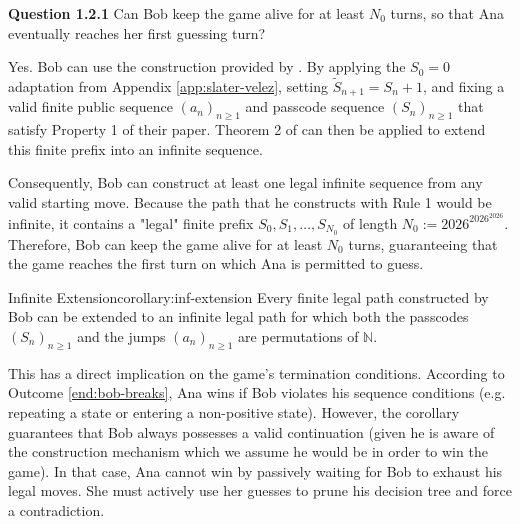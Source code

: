 \begin{questionbox}
\textbf{Question 1.2.1}
Can Bob keep the game alive for at least $N_0$ turns, so that Ana eventually reaches her first guessing turn?
\end{questionbox}

Yes. Bob can use the construction provided by \cite{slater1977permutations}. By applying the $S_0 = 0$ adaptation from Appendix \ref{app:slater-velez}, setting $\widetilde{S}_{n+1} = S_n + 1$, and fixing a valid finite public sequence $(a_n)_{n \ge 1}$ and passcode sequence $(S_n)_{n \ge 1}$ that satisfy Property 1 of their paper. Theorem 2 of \cite{slater1977permutations} can then be applied to extend this finite prefix into an infinite sequence. 

Consequently, Bob can construct at least one legal infinite sequence from any valid starting move. Because the path that he constructs with Rule 1 would be infinite, it contains a "legal" finite prefix $S_0, S_1, \ldots, S_{N_0}$ of length $N_0 := 2026^{2026^{2026}}$. Therefore, Bob can keep the game alive for at least $N_0$ turns, guaranteeing that the game reaches the first turn on which Ana is permitted to guess.



\begin{corollary}{Infinite Extension}{corollary:inf-extension}
\label{cor:inf-extension}
Every finite legal path constructed by Bob can be extended to an infinite legal path for which both the passcodes $(S_n)_{n\geq1}$ and the jumps $(a_n)_{n\geq1}$ are permutations of $\mathbb{N}$.
\end{corollary}


This has a direct implication on the game's termination conditions. According to Outcome \ref{end:bob-breaks}, Ana wins if Bob violates his sequence conditions (e.g. repeating a state or entering a non-positive state). However, the corollary guarantees that Bob always possesses a valid continuation (given he is aware of the construction mechanism which we assume he would be in order to win the game). In that case, Ana cannot win by passively waiting for Bob to exhaust his legal moves. She must actively use her guesses to prune his decision tree and force a contradiction.

